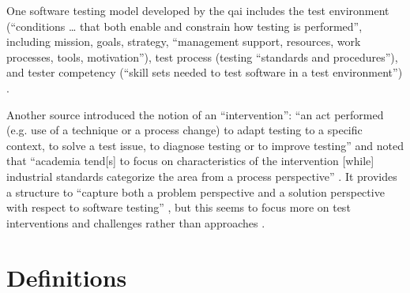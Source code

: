 One software testing model developed by the \acf{qai} includes the test
environment (``conditions \dots
that both enable and constrain how testing is performed'', including mission,
goals, strategy, ``management support, resources, work processes, tools,
motivation''), test process (testing ``standards and procedures''), and tester
competency (``skill sets needed to test software in a test environment'')
\citep[pp.~5-6]{Perry2006}.

Another source
introduced the notion of an ``intervention'': ``an act performed (e.g. use of a
technique or a process change) to adapt testing
to a specific context, to solve
a test issue, to diagnose testing or to improve testing''
\citep[p.~1]{engström_mapping_2015} and noted that ``academia tend[s] to focus on
characteristics of the intervention [while] industrial standards categorize the
area from a process perspective'' \citep[p.~2]{engström_mapping_2015}.
It provides a structure to ``capture both a problem perspective and a solution
perspective with respect to software testing'' \citep[pp.~3-4]{engström_mapping_2015},
but this seems to focus more on test interventions and challenges rather than
approaches \citep[Fig.~5]{engström_mapping_2015}.

\section{Definitions}

